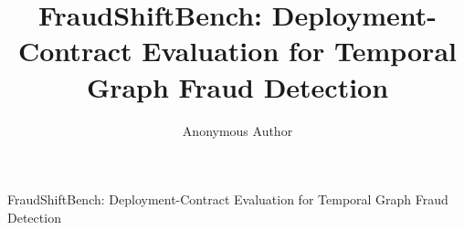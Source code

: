 \documentclass[10pt,journal]{IEEEtran}
\begin{document}
\title{FraudShiftBench: Deployment-Contract Evaluation for Temporal Graph Fraud Detection}

\author{Anonymous Author}

%
{FraudShiftBench: Deployment-Contract Evaluation for Temporal Graph Fraud Detection}

\maketitle













\balance


\end{document}
